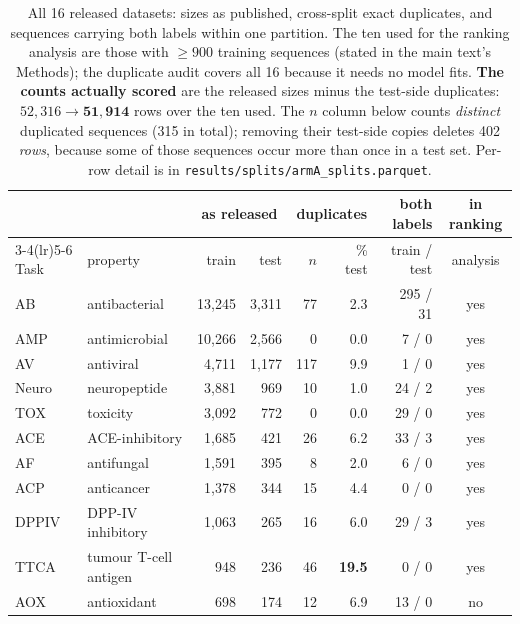 \documentclass[11pt,a4paper]{article}
\begin{document}
\begin{table}[htbp]\centering\small
\caption{All 16 released datasets: sizes as published, cross-split exact duplicates, and
sequences carrying both labels within one partition. The ten used for the ranking analysis
are those with $\geq 900$ training sequences (stated in the main text's Methods); the duplicate audit
covers all 16 because it needs no model fits. \textbf{The counts actually scored} are the
released sizes minus the test-side duplicates: $52{,}316 \to \mathbf{51{,}914}$ rows over
the ten used. The $n$ column below counts \emph{distinct} duplicated sequences (315 in
total); removing their test-side copies deletes 402 \emph{rows}, because some of those
sequences occur more than once in a test set. Per-row detail is in
\texttt{results/splits/armA\_splits.parquet}.}
\label{tab:armacounts}
\begin{tabular}{llrrrrrc}
\toprule
 & & \multicolumn{2}{c}{as released} & \multicolumn{2}{c}{duplicates} & both labels & in ranking \\
\cmidrule(lr){3-4}\cmidrule(lr){5-6}
Task & property & train & test & $n$ & \% test & train / test & analysis \\
\midrule
AB    & antibacterial         & 13{,}245 & 3{,}311 &  77 & 2.3  & 295 / 31 & yes \\
AMP   & antimicrobial         & 10{,}266 & 2{,}566 &   0 & 0.0  & 7 / 0    & yes \\
AV    & antiviral             &  4{,}711 & 1{,}177 & 117 & 9.9  & 1 / 0    & yes \\
Neuro & neuropeptide          &  3{,}881 &    969  &  10 & 1.0  & 24 / 2   & yes \\
TOX   & toxicity              &  3{,}092 &    772  &   0 & 0.0  & 29 / 0   & yes \\
ACE   & ACE-inhibitory        &  1{,}685 &    421  &  26 & 6.2  & 33 / 3   & yes \\
AF    & antifungal            &  1{,}591 &    395  &   8 & 2.0  & 6 / 0    & yes \\
ACP   & anticancer            &  1{,}378 &    344  &  15 & 4.4  & 0 / 0    & yes \\
DPPIV & DPP-IV inhibitory     &  1{,}063 &    265  &  16 & 6.0  & 29 / 3   & yes \\
TTCA  & tumour T-cell antigen &     948  &    236  &  46 & \textbf{19.5} & 0 / 0 & yes \\
\addlinespace
AOX   & antioxidant           &     698  &    174  &  12 & 6.9  & 13 / 0   & no \\

\end{tabular}
\end{table}
\end{document}
